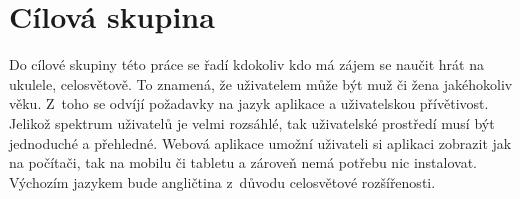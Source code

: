 \section{Cílová skupina}
\label{sc:target_audience}
Do cílové skupiny této práce se řadí kdokoliv kdo má zájem se naučit hrát na ukulele, celosvětově. To znamená, že uživatelem může být muž či žena jakéhokoliv věku. Z~toho se odvíjí požadavky na jazyk aplikace a uživatelskou přívětivost. Jelikož spektrum uživatelů je velmi rozsáhlé, tak uživatelské prostředí musí být jednoduché a přehledné. Webová aplikace umožní uživateli si aplikaci zobrazit jak na počítači, tak na mobilu či tabletu a zároveň nemá potřebu nic instalovat. Výchozím jazykem bude angličtina z~důvodu celosvětové rozšířenosti.
